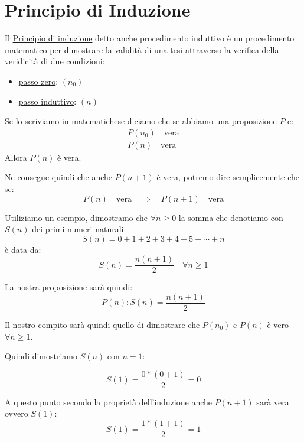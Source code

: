 \documentclass{article}
\begin{document}
\section{Principio di Induzione}
Il \underline{Principio di induzione} detto anche procedimento induttivo è un procedimento matematico per dimostrare la validità di una tesi attraverso la verifica della veridicità di due condizioni:
\begin{itemize}
        \item \underline{passo zero}: $(n_0)$
        \item \underline{passo induttivo}: $(n)$
\end{itemize}
Se lo scriviamo in matematichese diciamo che se abbiamo una proposizione $P$ e:
\begin{align*}
        P(n_0) \quad \mbox{vera} \\
        P(n) \quad \mbox{vera}
\end{align*}
Allora $P(n)$ è vera. \par
Ne consegue quindi che anche $P(n+1)$ è vera, potremo dire semplicemente che se:
\begin{equation*}
        P(n) \quad \mbox{vera} \quad \Rightarrow \quad P(n+1) \quad \mbox{vera}
\end{equation*}

Utiliziamo un esempio, dimostramo che $\forall n \ge 0$ la somma che denotiamo con $S(n)$ dei primi numeri naturali:
\begin{equation*}
        S(n) = 0 + 1 + 2 + 3 + 4 + 5 + \cdots + n
\end{equation*}
è data da:
\begin{equation*}
        S(n) = \frac{n(n+1)}{2} \quad \forall n \ge 1
\end{equation*}

La nostra proposizione sarà quindi:
\begin{equation*}
        P(n) : S(n) = \frac{n(n+1)}{2}
\end{equation*}

Il nostro compito sarà quindi quello di dimostrare che $P(n_0)$ e $P(n)$ è vero $\forall n \ge 1$. \par
Quindi dimostriamo $S(n)$ con $n = 1$:

\begin{equation}\label{eq:esempio_induzione_1}
        S(1) = \frac{0*(0+1)}{2} = 0
\end{equation}

A questo punto secondo la proprietà dell'induzione anche $P(n+1)$ sarà vera ovvero $S(1)$:
\begin{equation}\label{eq:esempio_induzione_2}
        S(1) = \frac{1*(1+1)}{2} = 1
\end{equation}
\end{document}
